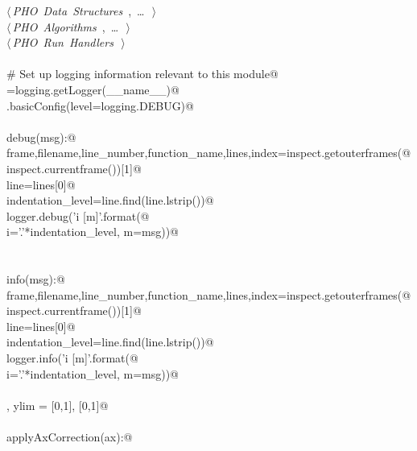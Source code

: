 \documentclass[12.0pt]{report}
\begin{document}
\begin{appendices}
\begin{flushleft}
\begin{list}{}{}
\mbox{}\verb@@\hbox{$\langle\,${\itshape PHO Data Structures}\nobreak\ {\footnotesize {}, \ldots\ }$\,\rangle$}\verb@@\\
\mbox{}\verb@@\hbox{$\langle\,${\itshape PHO Algorithms}\nobreak\ {\footnotesize {}, \ldots\ }$\,\rangle$}\verb@@\\
\mbox{}\verb@@\hbox{$\langle\,${\itshape PHO Run Handlers}\nobreak\ {\footnotesize {}}$\,\rangle$}\verb@@\\
\mbox{}\verb@@\\
\mbox{}\verb@# Set up logging information relevant to this module@\\
\mbox{}\verb@logger=logging.getLogger(__name__)@\\
\mbox{}\verb@logging.basicConfig(level=logging.DEBUG)@\\
\mbox{}\verb@@\\
\mbox{}\verb@def debug(msg):@\\
\mbox{}\verb@    frame,filename,line_number,function_name,lines,index=inspect.getouterframes(@\\
\mbox{}\verb@        inspect.currentframe())[1]@\\
\mbox{}\verb@    line=lines[0]@\\
\mbox{}\verb@    indentation_level=line.find(line.lstrip())@\\
\mbox{}\verb@    logger.debug('{i} [{m}]'.format(@\\
\mbox{}\verb@        i='.'*indentation_level, m=msg))@\\
\mbox{}\verb@@\\
\mbox{}\verb@@\\
\mbox{}\verb@def info(msg):@\\
\mbox{}\verb@    frame,filename,line_number,function_name,lines,index=inspect.getouterframes(@\\
\mbox{}\verb@        inspect.currentframe())[1]@\\
\mbox{}\verb@    line=lines[0]@\\
\mbox{}\verb@    indentation_level=line.find(line.lstrip())@\\
\mbox{}\verb@    logger.info('{i} [{m}]'.format(@\\
\mbox{}\verb@        i='.'*indentation_level, m=msg))@\\
\mbox{}\verb@@\\
\mbox{}\verb@xlim, ylim = [0,1], [0,1]@\\
\mbox{}\verb@@\\
\mbox{}\verb@def applyAxCorrection(ax):@\\

\end{list}
\end{flushleft}
\end{appendices}
\end{document}

